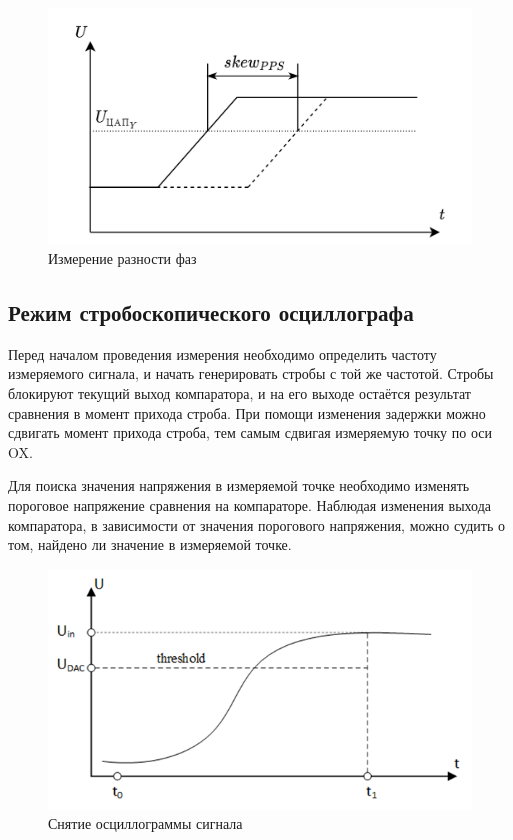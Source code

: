 \FloatBarrier

\begin{figure}[ht!] 
	\center
	\includegraphics [scale=0.4] {my_folder/images//measure_skew}
	\caption{Измерение разности фаз} 
	\label{fig:meas-skew}  
\end{figure}
 
\FloatBarrier

\subsection{Режим стробоскопического осциллографа}

Перед началом проведения измерения необходимо определить частоту измеряемого сигнала, и начать генерировать стробы с той же частотой.
Стробы блокируют текущий выход компаратора, и на его выходе остаётся результат сравнения в момент прихода строба.
При помощи изменения задержки можно сдвигать момент прихода строба, тем самым сдвигая измеряемую точку по оси OX.

Для поиска значения напряжения в измеряемой точке необходимо изменять пороговое напряжение сравнения на компараторе. 
Наблюдая изменения выхода компаратора, в зависимости от значения порогового напряжения, можно судить о том, найдено ли значение
в измеряемой точке.

\begin{figure}[ht!] 
	\center
	\includegraphics {my_folder/images//meas_alg}
	\caption{Снятие осциллограммы сигнала} 
	\label{fig:meas-alg}  
\end{figure}

